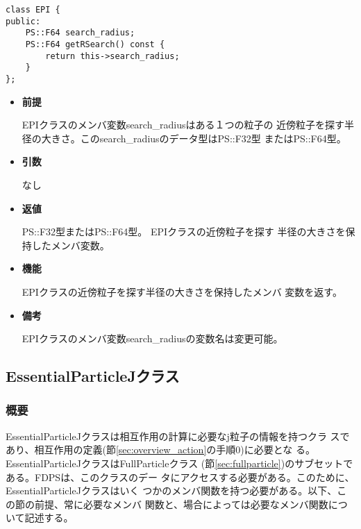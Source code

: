 

\begin{screen}
\begin{verbatim}
class EPI {
public:
    PS::F64 search_radius;
    PS::F64 getRSearch() const {
        return this->search_radius;
    }
};
\end{verbatim}
\end{screen}

\begin{itemize}

\item {\bf 前提}

  EPIクラスのメンバ変数search\_radiusはある１つの粒子の
  近傍粒子を探す半径の大きさ。このsearch\_radiusのデータ型はPS::F32型
  またはPS::F64型。
  
\item {\bf 引数}

  なし
  
\item {\bf 返値}

  PS::F32型またはPS::F64型。 EPIクラスの近傍粒子を探す
  半径の大きさを保持したメンバ変数。
  
\item {\bf 機能}

  EPIクラスの近傍粒子を探す半径の大きさを保持したメンバ
  変数を返す。

\item {\bf 備考}

  EPIクラスのメンバ変数search\_radiusの変数名は変更可能。
  
\end{itemize}

\subsection{EssentialParticleJクラス}
\label{sec:example_essentialparticlej}

\subsubsection{概要}

EssentialParticleJクラスは相互作用の計算に必要なj粒子の情報を持つクラ
スであり、相互作用の定義(節\ref{sec:overview_action}の手順0)に必要とな
る。EssentialParticleJクラスはFullParticleクラス
(節\ref{sec:fullparticle})のサブセットである。FDPSは、このクラスのデー
タにアクセスする必要がある。このために、EssentialParticleJクラスはいく
つかのメンバ関数を持つ必要がある。以下、この節の前提、常に必要なメンバ
関数と、場合によっては必要なメンバ関数について記述する。

